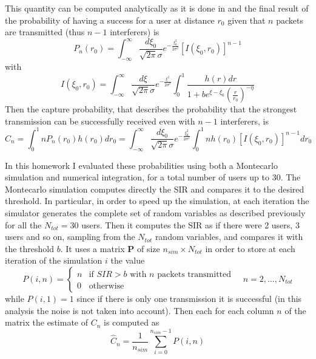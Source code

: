 \documentclass[10pt]{article}
\begin{document}
This quantity can be computed analytically as it is done in \cite{capture} and the final result of the probability of having a success for a user at distance $r_0$ given that $n$ packets are transmitted (thus $n-1$ interferers) is
\begin{equation}
  P_n(r_0) = \int_{-\infty}^{\infty} \frac{d\xi_0}{\sqrt{2\pi}\sigma} e^{-\frac{\xi_0^2}{2\sigma^2}}[I(\xi_0, r_0)]^{n-1}
\end{equation}
with 
\begin{equation}
  I(\xi_0, r_0) = \int_{-\infty}^{\infty} \frac{d\xi}{\sqrt{2\pi}\sigma}e^{-\frac{\xi^2}{2\sigma^2}} \int_{0}^{1} \frac{h(r) dr}{1+be^{\xi - \xi_0}\left(\frac{r}{r_0}\right)^{-\eta}}
\end{equation}
Then the capture probability, that describes the probability that the strongest transmission can be successfully received even with $n-1$ interferers, is
\begin{equation}
  C_n = \int_0^1 nP_n(r_0)h(r_0) dr_0 = \int_{-\infty}^{\infty} \frac{d\xi_0}{\sqrt{2\pi}\sigma} e^{-\frac{\xi_0^2}{2\sigma^2}} \int_0^1 n h(r_0) [I(\xi_0, r_0)]^{n-1} dr_0
\end{equation}

In this homework I evaluated these probabilities using both a Montecarlo simulation and numerical integration, for a total number of users up to 30. The Montecarlo simulation computes directly the SIR and compares it to the desired threshold. In particular, in order to speed up the simulation, at each iteration the simulator generates the complete set of random variables as described previously for all the $N_{tot} = 30$ users. Then it computes the SIR as if there were 2 users, 3 users and so on, sampling from the $N_{tot}$ random variables, and compares it with the threshold $b$. It uses a matrix $\mathbf{P}$ of size $n_{sim} \times N_{tot}$ in order to store at each iteration of the simulation $i$ the value
\begin{equation}
P(i, n) = 
\begin{cases}
  n & \mbox{if } SIR > b \mbox{ with } n \mbox{ packets transmitted}\\
  0 & \mbox{otherwise}
\end{cases}
 \quad n = 2, \dots, N_{tot}
\end{equation}
while $P(i, 1) = 1$ since if there is only one transmission it is successful (in this analysis the noise is not taken into account).
Then each for each column $n$ of the matrix the estimate of $C_n$ is computed as
\begin{equation}
  \hat{C}_n = \frac{1}{n_{sim}} \sum_{i = 0}^{n_{sim} - 1} P(i, n)
\end{equation}
\end{document}
